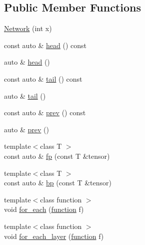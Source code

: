 \subsection*{Public Member Functions}
\begin{DoxyCompactItemize}
\item 
\hyperlink{structBC_1_1nn_1_1Network_3_01Index_00_01DerivedNetwork_00_01Layer_01_4_aee27f202b45fce694bd46e222f13c13f}{Network} (int x)
\item 
const auto \& \hyperlink{structBC_1_1nn_1_1Network_3_01Index_00_01DerivedNetwork_00_01Layer_01_4_a8ee3fb27c1f47d560d069bde4c4d4605}{head} () const 
\item 
auto \& \hyperlink{structBC_1_1nn_1_1Network_3_01Index_00_01DerivedNetwork_00_01Layer_01_4_ab30eaa3d8378a27241c98e8f2a5d9b94}{head} ()
\item 
const auto \& \hyperlink{structBC_1_1nn_1_1Network_3_01Index_00_01DerivedNetwork_00_01Layer_01_4_ae878bb2ae5e7ac7c1225c731678407fb}{tail} () const 
\item 
auto \& \hyperlink{structBC_1_1nn_1_1Network_3_01Index_00_01DerivedNetwork_00_01Layer_01_4_a1eeb7a39bd900bd7baafffc7a8df913b}{tail} ()
\item 
const auto \& \hyperlink{structBC_1_1nn_1_1Network_3_01Index_00_01DerivedNetwork_00_01Layer_01_4_ae394d69c3ab43a05033342fb596888f6}{prev} () const 
\item 
auto \& \hyperlink{structBC_1_1nn_1_1Network_3_01Index_00_01DerivedNetwork_00_01Layer_01_4_a818e4e8dfb52039beff777dd1ace897d}{prev} ()
\item 
{\footnotesize template$<$class T $>$ }\\const auto \& \hyperlink{structBC_1_1nn_1_1Network_3_01Index_00_01DerivedNetwork_00_01Layer_01_4_a9d9fa956fd18031ea77be6c0ccd99139}{fp} (const T \&tensor)
\item 
{\footnotesize template$<$class T $>$ }\\const auto \& \hyperlink{structBC_1_1nn_1_1Network_3_01Index_00_01DerivedNetwork_00_01Layer_01_4_a5724756452e2dedd44a1ccbaff85643a}{bp} (const T \&tensor)
\item 
{\footnotesize template$<$class function $>$ }\\void \hyperlink{structBC_1_1nn_1_1Network_3_01Index_00_01DerivedNetwork_00_01Layer_01_4_ab2d8b265d4bc192ff7c18f57af90669f}{for\+\_\+each} (\hyperlink{namespaceBC_1_1nn_a5429ceaa392776ade7234175af39050d}{function} f)
\item 
{\footnotesize template$<$class function $>$ }\\void \hyperlink{structBC_1_1nn_1_1Network_3_01Index_00_01DerivedNetwork_00_01Layer_01_4_abee880a63d2a5b428fb93a7165952263}{for\+\_\+each\+\_\+layer} (\hyperlink{namespaceBC_1_1nn_a5429ceaa392776ade7234175af39050d}{function} f)
\end{DoxyCompactItemize}
